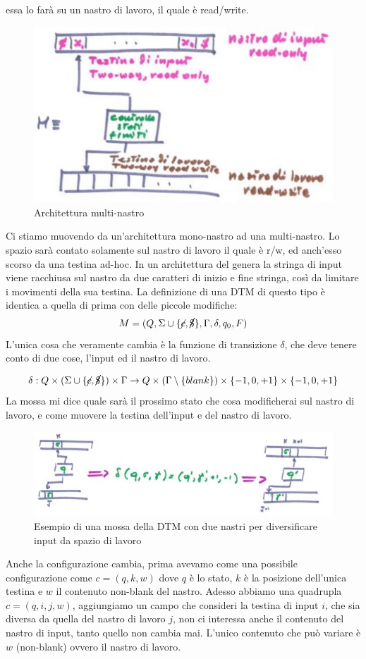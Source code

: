 \documentclass{article}
\begin{document}
essa lo farà su un nastro di lavoro, il quale è read/write.
\begin{figure}[H]
    \centering
    \includegraphics[scale=0.6]{images/nastri_sep_input.png}
    \caption{Architettura multi-nastro}
\end{figure}
Ci stiamo muovendo da un'architettura mono-nastro ad una multi-nastro. Lo spazio sarà contato
solamente sul nastro di lavoro il quale è r/w, ed anch'esso scorso da una testina ad-hoc. In
un architettura del genera la stringa di input viene racchiusa sul nastro da due caratteri
di inizio e fine stringa, così da limitare i movimenti della sua testina.
La definizione di una DTM di questo tipo è identica a quella di prima con delle piccole modifiche:
$$M=(Q,\Sigma\cup\{\cancel{c},\cancel{\$} \},\Gamma,\delta,q_0,F)$$
L'unica cosa che veramente cambia è la funzione di transizione $\delta$, che deve tenere
conto di due cose, l'input ed il nastro di lavoro.

$$\delta:Q\times(\Sigma\cup\{\cancel{c},\cancel{\$} \})\times\Gamma\rightarrow Q\times(\Gamma\setminus\{blank\})\times\{-1,0,+1\}\times \{-1,0,+1\}$$
La mossa mi dice quale sarà il prossimo stato che cosa modificherai sul nastro di lavoro, e
come muovere la testina dell'input e del nastro di lavoro.
\begin{figure}[H]
    \centering
    \includegraphics[scale=0.5]{images/DTM_input_transition.png}
    \caption{Esempio di una mossa della DTM con due nastri per diversificare input da
        spazio di lavoro}
\end{figure}
Anche la configurazione cambia, prima avevamo come una possibile configurazione come
$c=(q,k,w)$ dove $q$ è lo stato, $k$ è la posizione dell'unica testina e $w$ il contenuto non-blank
del nastro. Adesso abbiamo una quadrupla $c=(q,i,j,w)$, aggiungiamo un campo che consideri
la testina di input $i$, che sia diversa
da quella del nastro di lavoro $j$, non ci interessa anche il contenuto del
nastro di input, tanto quello non cambia mai. L'unico contenuto che può variare è $w$ (non-blank)
ovvero il nastro di lavoro.
\end{document}
